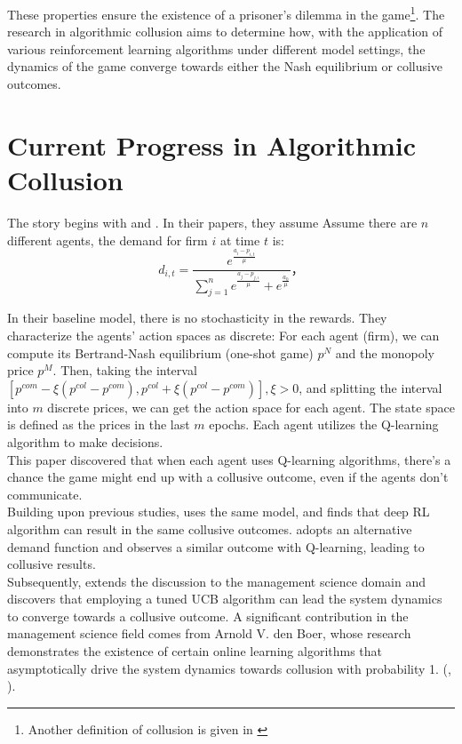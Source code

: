 \documentclass[12pt]{article}
\begin{document}
{These properties ensure the existence of a prisoner's dilemma in the game\footnote{Another definition of collusion is given in \cite{calvano2023algorithmic}}. The research in algorithmic collusion aims to determine how, with the application of various reinforcement learning algorithms under different model settings, the dynamics of the game converge towards either the Nash equilibrium or collusive outcomes.

\section{Current Progress in Algorithmic Collusion} \label{sec:progress}

The story begins with \cite{calvano2019algorithmic} and \cite{calvano2020artificial}. In their papers, they assume Assume there are $n$ different agents, the demand for firm $i$ at time $t$ is:
\begin{equation}
    d_{i,t}=\frac{e^{\frac{a_i-p_{i,t}}\mu}}{\sum_{j=1}^ne^{\frac{a_j-p_{j,\iota}}\mu}+e^{\frac{a_0}\mu}}，
\end{equation}

In their baseline model, there is no stochasticity in the rewards. They characterize the agents' action spaces as discrete: For each agent (firm), we can compute its Bertrand-Nash equilibrium (one-shot game) $p^N$ and the monopoly price $p^M$. Then, taking the interval $[p^{com}-\xi(p^{col}-p^{com}), p^{col}+\xi(p^{col}-p^{com})], \xi>0$, and splitting the interval into $m$ discrete prices, we can get the action space for each agent. The state space is defined as the prices in the last $m$ epochs. Each agent utilizes the Q-learning algorithm to make decisions. \\

This paper discovered that when each agent uses Q-learning algorithms, there's a chance the game might end up with a collusive outcome, even if the agents don't communicate. \\

Building upon previous studies, \cite{hettich2021algorithmic} uses the same model, and finds that deep RL algorithm can result in the same collusive outcomes. \cite{klein2021autonomous} adopts an alternative demand function and observes a similar outcome with Q-learning, leading to collusive results.\\

Subsequently, \cite{hansen2021frontiers} extends the discussion to the management science domain and discovers that employing a tuned UCB algorithm can lead the system dynamics to converge towards a collusive outcome. A significant contribution in the management science field comes from Arnold V. den Boer, whose research demonstrates the existence of certain online learning algorithms that asymptotically drive the system dynamics towards collusion with probability 1. (\cite{meylahn2022learning}, \cite{loots2023data}). \\

}
\end{document}
